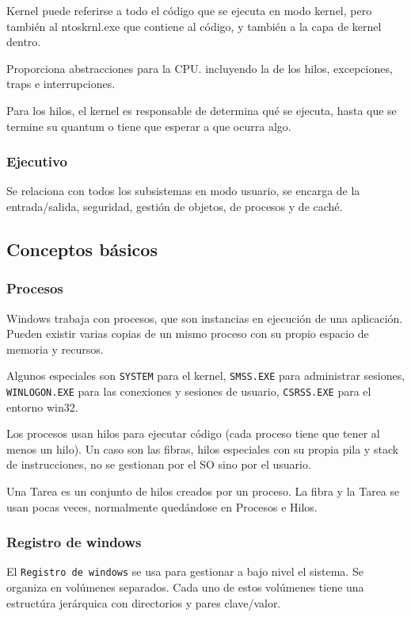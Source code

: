         Kernel puede referirse a todo el código que se ejecuta en modo kernel, pero también al ntoskrnl.exe que contiene al código, y también a la capa de kernel dentro.

        Proporciona abstracciones para la CPU. incluyendo la de los hilos, excepciones, traps e interrupciones.

        Para los hilos, el kernel es responsable de determina qué se ejecuta, hasta que se termine su quantum o tiene que esperar a que ocurra algo.

    \subsubsection{Ejecutivo}
        Se relaciona con todos los subsistemas en modo usuario, se encarga de la entrada/salida, seguridad, gestión de objetos, de procesos y de caché.
\subsection{Conceptos básicos}

    \subsubsection{Procesos}
        Windows trabaja con procesos, que son instancias en ejecución de una aplicación. Pueden existir varias copias de un mismo proceso con su propio espacio de memoria y recursos.

        Algunos especiales son \texttt{SYSTEM} para el kernel, \texttt{SMSS.EXE} para administrar sesiones, \texttt{WINLOGON.EXE} para las conexiones y sesiones de usuario, \texttt{CSRSS.EXE} para el entorno win32.

        Los procesos usan hilos para ejecutar código (cada proceso tiene que tener al menos un hilo). Un caso son las fibras, hilos especiales con su propia pila y stack de instrucciones, no se gestionan por el SO sino por el usuario.

        Una Tarea es un conjunto de hilos creados por un proceso. La fibra y la Tarea se usan pocas veces, normalmente quedándose en Procesos e Hilos.

    \subsubsection{Registro de windows}
        El \texttt{Registro de windows} se usa para gestionar a bajo nivel el sistema. Se organiza en volúmenes separados. Cada uno de estos volúmenes tiene una estructúra jerárquica con directorios y pares clave/valor.

